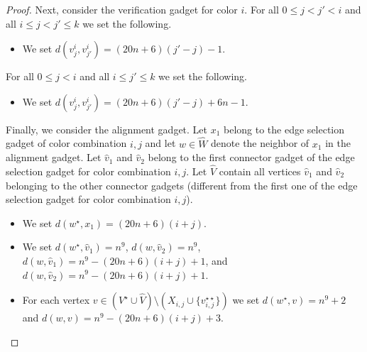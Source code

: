 \documentclass[a4paper,UKenglish,cleveref, autoref, thm-restate]{lipics-v2021}
\begin{document}
\begin{proof}
Next, consider the verification gadget for color $i$. 
%
For all $0\le j<j'<i$ and all $i\le j<j'\le k$ we set the following.
\begin{itemize}
    \item We set $d(v^i_j,v^i_{j'})=(20n+6)(j'-j)-1$.
\end{itemize}
For all $0\le j<i$ and all $i\le j'\le k$ we set the following.
\begin{itemize}
    \item We set $d(v^i_j,v^i_{j'})=(20n+6)(j'-j)+6n-1$.
\end{itemize}

Finally, we consider the alignment gadget. Let $x_1$ belong to the edge selection gadget of color combination $i,j$ and let $w\in \hat{W}$ denote the neighbor of $x_1$ in the alignment gadget. Let $\hat{v}_1$ and $\hat{v}_2$ belong to the first connector gadget of the edge selection gadget for color combination $i,j$. Let $\hat{V}$ contain all vertices $\hat{v}_1$ and $\hat{v}_2$ belonging to the other connector gadgets (different from the first one of the edge selection gadget for color combination $i,j$). 
\begin{itemize}
    \item We set $d(w^\star,x_1)=(20n+6)(i+j)$.
    \item We set $d(w^\star,\hat{v}_1)=n^9$, $d(w,\hat{v}_2)=n^9$, $d(w,\hat{v}_1)=n^9-(20n+6)(i+j)+1$, and $d(w,\hat{v}_2)=n^9-(20n+6)(i+j)+1$.
    \item For each vertex $v\in (V^\star\cup \hat{V})\setminus (X_{i,j}\cup \{v_{i,j}^{\star\star}\})$ we set $d(w^\star,v)=n^9+2$ and $d(w,v)=n^9-(20n+6)(i+j)+3$.
\end{itemize}


\end{proof}
\end{document}
